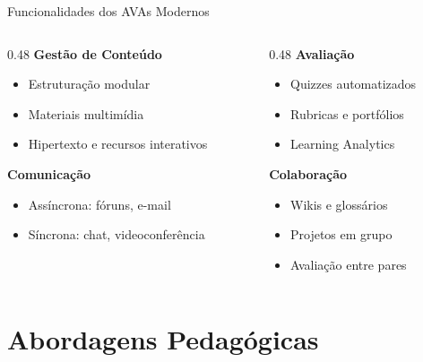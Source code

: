 \documentclass[aspectratio=169,xcolor=table]{beamer}
\begin{document}
\begin{frame}{Funcionalidades dos AVAs Modernos}
    \begin{columns}[T]
        \begin{column}{0.48\textwidth}
            \textbf{Gestão de Conteúdo}
            \begin{itemize}
                \item Estruturação modular
                \item Materiais multimídia
                \item Hipertexto e recursos interativos
            \end{itemize}
            \vspace{0.5em}
            \textbf{Comunicação}
            \begin{itemize}
                \item Assíncrona: fóruns, e-mail
                \item Síncrona: chat, videoconferência
            \end{itemize}
        \end{column}
        \begin{column}{0.48\textwidth}
            \textbf{Avaliação}
            \begin{itemize}
                \item Quizzes automatizados
                \item Rubricas e portfólios
                \item Learning Analytics
            \end{itemize}
            \vspace{0.5em}
            \textbf{Colaboração}
            \begin{itemize}
                \item Wikis e glossários
                \item Projetos em grupo
                \item Avaliação entre pares
            \end{itemize}
        \end{column}
    \end{columns}
\end{frame}

\section{Abordagens Pedagógicas}
\end{document}
